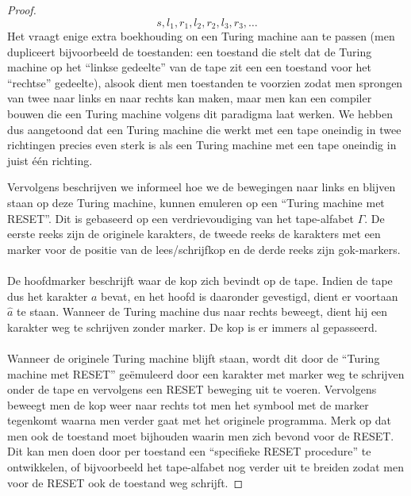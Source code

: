 \documentclass[a4paper]{article}
\begin{document}
\begin{question}
\begin{answer}
\begin{enumerate}
\begin{proof}
\begin{equation}
s,l_1,r_1,l_2,r_2,l_3,r_3,\ldots
\end{equation}
Het vraagt enige extra boekhouding on een Turing machine aan te passen (men dupliceert bijvoorbeeld de toestanden: een toestand die stelt dat de Turing machine op het ``linkse gedeelte'' van de tape zit een een toestand voor het ``rechtse'' gedeelte), alsook dient men toestanden te voorzien zodat men sprongen van twee naar links en naar rechts kan maken, maar men kan een compiler bouwen die een Turing machine volgens dit paradigma laat werken. We hebben dus aangetoond dat een Turing machine die werkt met een tape oneindig in twee richtingen precies even sterk is als een Turing machine met een tape oneindig in juist \'e\'en richting.

Vervolgens beschrijven we informeel hoe we de bewegingen naar links en blijven staan op deze Turing machine, kunnen emuleren op een ``Turing machine met RESET''. Dit is gebaseerd op een verdrievoudiging van het tape-alfabet $\Gamma$. De eerste reeks zijn de originele karakters, de tweede reeks de karakters met een marker voor de positie van de lees/schrijfkop en de derde reeks zijn gok-markers.
\paragraph{}
De hoofdmarker beschrijft waar de kop zich bevindt op de tape. Indien de tape dus het karakter $a$ bevat, en het hoofd is daaronder gevestigd, dient er voortaan $\hat{a}$ te staan. Wanneer de Turing machine dus naar rechts beweegt, dient hij een karakter weg te schrijven zonder marker. De kop is er immers al gepasseerd.
\paragraph{}
Wanneer de originele Turing machine blijft staan, wordt dit door de ``Turing machine met RESET'' ge\"emuleerd door een karakter met marker weg te schrijven onder de tape en vervolgens een RESET beweging uit te voeren. Vervolgens beweegt men de kop weer naar rechts tot men het symbool met de marker tegenkomt waarna men verder gaat met het originele programma. Merk op dat men ook de toestand moet bijhouden waarin men zich bevond voor de RESET. Dit kan men doen door per toestand een ``specifieke RESET procedure'' te ontwikkelen, of bijvoorbeeld het tape-alfabet nog verder uit te breiden zodat men voor de RESET ook de toestand weg schrijft.

\end{proof}
\end{enumerate}
\end{answer}
\end{question}
\end{document}
